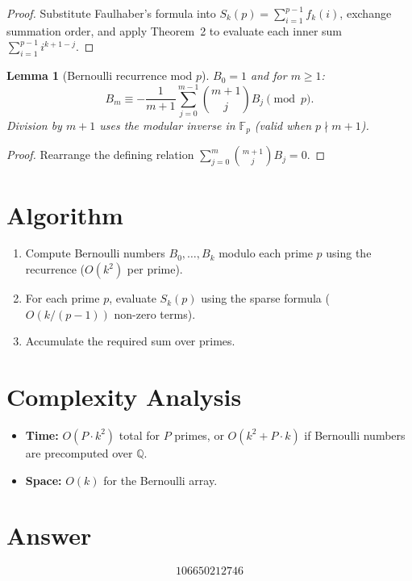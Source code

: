 \documentclass[12pt]{article}
\newtheorem{lemma}[theorem]{Lemma}
\begin{document}
\begin{proof}
Substitute Faulhaber's formula into $S_k(p) = \sum_{i=1}^{p-1}f_k(i)$, exchange summation order, and apply Theorem~2 to evaluate each inner sum $\sum_{i=1}^{p-1}i^{k+1-j}$.
\end{proof}

\begin{lemma}[Bernoulli recurrence mod $p$]
$B_0=1$ and for $m\ge 1$:
\[
B_m \equiv -\frac{1}{m+1}\sum_{j=0}^{m-1}\binom{m+1}{j}B_j \pmod{p}.
\]
Division by $m+1$ uses the modular inverse in $\mathbb{F}_p$ (valid when $p\nmid m+1$).
\end{lemma}

\begin{proof}
Rearrange the defining relation $\sum_{j=0}^m\binom{m+1}{j}B_j = 0$.
\end{proof}

\section{Algorithm}
\begin{enumerate}
\item Compute Bernoulli numbers $B_0,\ldots,B_k$ modulo each prime $p$ using the recurrence ($O(k^2)$ per prime).
\item For each prime $p$, evaluate $S_k(p)$ using the sparse formula ($O(k/(p-1))$ non-zero terms).
\item Accumulate the required sum over primes.
\end{enumerate}

\section{Complexity Analysis}
\begin{itemize}
\item \textbf{Time:} $O(P\cdot k^2)$ total for $P$ primes, or $O(k^2 + P\cdot k)$ if Bernoulli numbers are precomputed over $\mathbb{Q}$.
\item \textbf{Space:} $O(k)$ for the Bernoulli array.
\end{itemize}

\section{Answer}

\[
\boxed{106650212746}
\]
\end{document}
